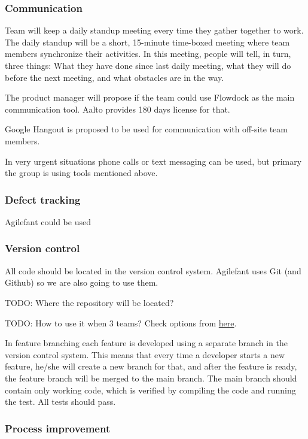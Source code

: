 \subsubsection{Communication}

Team will keep a daily standup meeting every time they gather together to work. 
The daily standup will be a short, 15-minute time-boxed meeting where team 
members synchronize their activities. In this meeting, people will tell, in 
turn, three things: What they have done since last daily meeting, what they 
will do before the next meeting, and what obstacles are in the way.  

The product manager will propose if the team could use Flowdock as the main 
communication tool. Aalto provides 180 days license for that.

Google Hangout is proposed to be used for communication with off-site team 
members.

In very urgent situations phone calls or text messaging can be used, but 
primary the group is using tools mentioned above.

\subsubsection{Defect tracking}

Agilefant could be used

\subsubsection{Version control}

All code should be located in the version control system.
Agilefant uses Git (and Github) so we are also going to use 
them.

TODO: Where the repository will be located?

TODO: How to use it when 3 teams? Check options from 
\href{https://www.atlassian.com/git/workflows}{here}.

In feature branching each feature is developed using a separate 
branch in the version control system. This means that every time 
a developer starts a new feature, he/she will create a new 
branch for that, and after the feature is ready, the feature 
branch will be merged to the main branch. The main branch should 
contain only working code, which is verified by compiling the 
code and running the test. All tests should pass.

\subsubsection{Process improvement}


